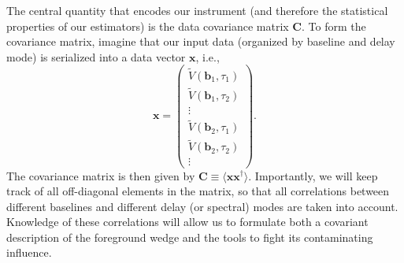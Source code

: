 \documentclass[twocolumn,aps,prd,nofootinbib,showpacs]{revtex4-1}
\begin{document}
The central quantity that encodes our instrument (and therefore the statistical properties of our estimators) is the data covariance matrix $\mathbf{C}$.  To form the covariance matrix, imagine that our input data (organized by baseline and delay mode) is serialized into a data vector $\mathbf{x}$, i.e.,
\begin{equation}
\mathbf{x} = \left( \begin{array}{c}
\widetilde{V} (\mathbf{b}_1, \tau_1) \\
\widetilde{V} (\mathbf{b}_1, \tau_2) \\
\vdots \\
\widetilde{V} (\mathbf{b}_2, \tau_1) \\
\widetilde{V} (\mathbf{b}_2, \tau_2) \\
\vdots
\end{array}
\right).
\end{equation}
The covariance matrix is then given by $\mathbf{C} \equiv \langle \mathbf{x} \mathbf{x}^\dagger \rangle$.  Importantly, we will keep track of all off-diagonal elements in the matrix, so that all correlations between different baselines and different delay (or spectral) modes are taken into account.  Knowledge of these correlations will allow us to formulate both a covariant description of the foreground wedge and the tools to fight its contaminating influence.
\end{document}
